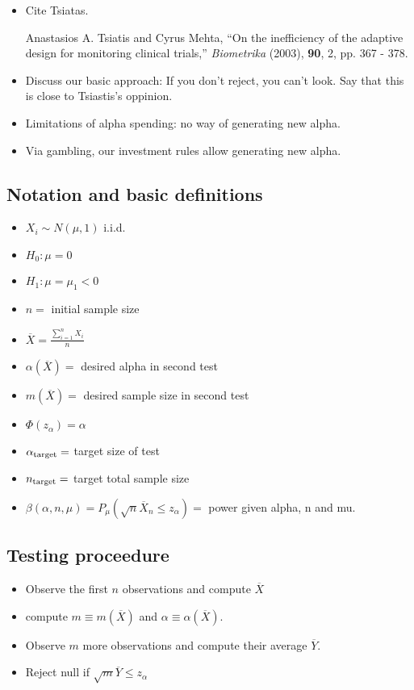 \documentclass{article}
\newcommand{\target}{{\hbox{\scriptsize target}}}
\begin{document}
\begin{itemize}
\item Cite Tsiatas.

Anastasios A. Tsiatis and Cyrus Mehta, ``On the inefficiency of the
adaptive design for monitoring clinical trials,'' {\em Biometrika}
(2003), {\bf 90}, 2, pp. 367 - 378.
\item Discuss our basic approach: If you don't reject, you can't look.
  Say that this is close to Tsiastis's oppinion.
\item Limitations of alpha spending: no way of generating new alpha.
\item Via gambling, our investment rules allow generating new alpha.
\end{itemize}


\subsection{Notation and  basic definitions}
\begin{itemize}
\item $X_i \sim N(\mu,1)$ i.i.d.
\item  $H_0: \mu = 0$
\item  $H_1: \mu = \mu_1 < 0$ 
\item  $n = $ initial sample size
\item  $\overline{X} = \frac{\sum_{i=1}^n X_i}{n}$ 
\item  $\alpha(\overline{X}) = $ desired alpha in second test
\item  $m(\overline{X}) = $ desired sample size in second test
\item $\Phi(z_\alpha) = \alpha$
\item $\alpha_\target = $ target size of test
\item $n_\target = $ target total sample size
\item $\beta(\alpha,n,\mu) = P_\mu(\sqrt{n}\overline{X}_n \le
z_\alpha) = $ power given alpha, n and mu.
\end{itemize}


\subsection{Testing proceedure}
\begin{itemize}
\item Observe the first $n$ observations and compute $\overline{X}$
\item compute $m \equiv m({\overline{X}})$ and $\alpha \equiv \alpha(\overline{X})$.
\item Observe $m$ more observations and compute their
average $\overline{Y}$.
\item Reject null if $\sqrt{m} \overline{Y} \le z_{\alpha}$
\end{itemize}
\end{document}
